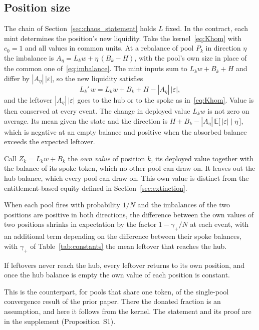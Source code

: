 \documentclass[11pt,a4paper]{article}
\theoremstyle{siphon}
\begin{document}
\subsection{Position size}\label{sec:possize}

The chain of Section~\ref{sec:chaos_statement} holds $L$ fixed. In the contract, each mint determines the position's new liquidity. Take the kernel~\eqref{eq:Khom} with $c_0 = 1$ and all values in common units. At a rebalance of pool $P_k$ in direction $\eta$ the imbalance is $A_\eta = L_k w + \eta\,(B_k - H)$, with the pool's own size in place of the common one of~\eqref{eq:imbalance}. The mint inputs sum to $L_k w + B_k + H$ and differ by $|A_\eta|\,|\varepsilon|$, so the new liquidity satisfies
\begin{equation}\label{eq:Lupdate}
L_k'\,w = L_k w + B_k + H - |A_\eta|\,|\varepsilon| ,
\end{equation}
and the leftover $|A_\eta|\,|\varepsilon|$ goes to the hub or to the spoke as in~\eqref{eq:Khom}. Value is then conserved at every event. The change in deployed value $L_k w$ is not zero on average. Its mean given the state and the direction is $H + B_k - |A_\eta|\,\mathbb{E}\bigl[\,|\varepsilon| \mid \eta\,\bigr]$, which is negative at an empty balance and positive when the absorbed balance exceeds the expected leftover.

Call $Z_k = L_k w + B_k$ the \emph{own value} of position $k$, its deployed value together with the balance of its spoke token, which no other pool can draw on. It leaves out the hub balance, which every pool can draw on. This own value is distinct from the entitlement-based equity defined in Section~\ref{sec:extinction}.

When each pool fires with probability $1/N$ and the imbalances of the two positions are positive in both directions, the difference between the own values of two positions shrinks in expectation by the factor $1 - \gamma_+/N$ at each event, with an additional term depending on the difference between their spoke balances, with $\gamma_+$ of Table~\ref{tab:constants} the mean leftover that reaches the hub. 

If leftovers never reach the hub, every leftover returns to its own position, and once the hub balance is empty the own value of each position is constant. 

This is the counterpart, for pools that share one token, of the single-pool convergence result of the prior paper\cite{ryan2026siphon}. There the donated fraction is an assumption, and here it follows from the kernel. The statement and its proof are in the supplement (Proposition~S1).
\end{document}
